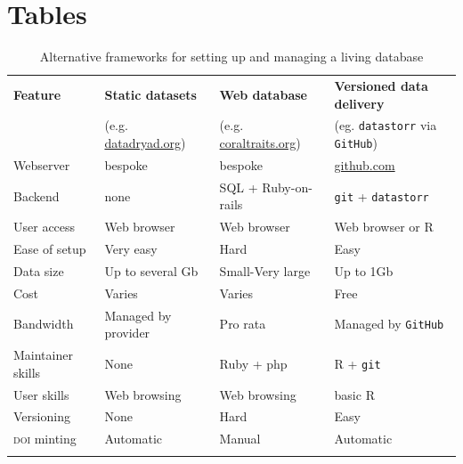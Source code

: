 \documentclass[a4paper,11pt]{article}
\newcommand{\smurl}[1]{{\footnotesize\url{#1}}}
\begin{document}




\newpage

\section{Tables}

\begin{table}[h!]
\centering
\caption{Alternative frameworks for setting up and managing a living database}
{\footnotesize
\vspace{1cm}
  \begin{tabular}{p{2.5cm}p{3.5cm}p{3.5cm}p{4cm}}
  \hline
  \textbf{Feature} & \textbf{Static datasets}& \textbf{Web database} & \textbf{Versioned data delivery}\\
  \textbf{} & (e.g. \smurl{datadryad.org})& (e.g. \smurl{coraltraits.org}) & (eg. \texttt{datastorr} via \texttt{GitHub})\\
  \hline
   Webserver        & bespoke & bespoke &  \smurl{github.com}\\
   Backend          & none & SQL + Ruby-on-rails 			& \texttt{git} + \texttt{datastorr} \\
   User access      & Web browser & Web browser 				    & Web browser or R \\
   Ease of setup    & Very easy & Hard 							& Easy\\
   Data size        & Up to several Gb & Small-Very large 				& Up to 1Gb\\
   Cost             & Varies & Varies  						& Free \\
   Bandwidth        & Managed by provider & Pro rata 						& Managed by \texttt{GitHub}\\
   Maintainer skills & None & Ruby + php 					& R + \texttt{git} \\
   User skills      &Web browsing& Web browsing  					& basic R \\
   Versioning       &None& Hard 							& Easy \\
   \textsc{doi} minting      &Automatic & Manual 					& Automatic \\
  \hline 
  \\
 
  \end{tabular}
  } 
\label{tab:sql_v_versioneddata}
\end{table}
\end{document}
